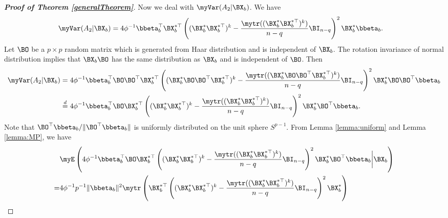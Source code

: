 \begin{proof}[\textbf{Proof of Theorem \ref{generalTheorem}}]
Now we deal with $\myVar (A_2 |\BX_b)$.
We have
\begin{align*}
                \myVar (A_2|\BX_b)&= 
                4 \phi^{-1} \bbeta_b^\top \BX_b^{*\top}
                \left( (\BX_b^* \BX_b^{*\top})^{k} 
                    -\frac{\mytr ( (\BX_b^* \BX_b^{*\top})^{k})}{n-q} 
                \BI_{n-q}
            \right)^2  \BX_b^* \bbeta_b
            .
\end{align*}
Let $\BO$ be a $p\times p$ random matrix  which is generated from Haar distribution and is independent of $\BX_b$.
The rotation invariance of normal distribution implies that $\BX_b\BO$ has the same distribution as $\BX_b$ and is independent of $\BO$.
Then
\begin{equation*}
    \begin{split}
    \myVar (A_2 |\BX_b)
    &=
    4\phi^{-1} \bbeta_b^\top \BO \BO^\top  \BX_b^{*\top}
                \left( (\BX_b^* \BO \BO^\top \BX_b^{*\top})^{k} 
                    -\frac{\mytr ( (\BX_b^* \BO \BO^\top  \BX_b^{*\top})^{k})}{n-q} 
                \BI_{n-q}
            \right)^2  \BX_b^* \BO \BO^\top  \bbeta_b
            \\
            &\overset{d}{=}
            4\phi^{-1} \bbeta_b^\top \BO  \BX_b^{*\top}
                \left( (\BX_b^*  \BX_b^{*\top})^{k} 
                    -\frac{\mytr ( (\BX_b^*  \BX_b^{*\top})^{k})}{n-q} 
                \BI_{n-q}
            \right)^2  \BX_b^* \BO^\top  \bbeta_b.
    \end{split}
\end{equation*}
Note that $\BO^\top \bbeta_b/\|\BO^\top \bbeta_b\|$ is uniformly distributed on the unit sphere $S^{p-1}$.
From Lemma \ref{lemma:uniform} and Lemma \ref{lemma:MP}, we have
\begin{equation*}
    \begin{split}
        &
                \myE\left(
                    4\phi^{-1} \bbeta_b^\top \BO  \BX_b^{*\top}
                    \left( (\BX_b^*  \BX_b^{*\top})^{k} 
                        -\frac{\mytr ( (\BX_b^*  \BX_b^{*\top})^{k})}{n-q} 
                \BI_{n-q}
            \right)^2  \BX_b^* \BO^\top  \bbeta_b
            \bigg| \BX_b
        \right)
        \\
        =&
        4\phi^{-1} p^{-1}\|\bbeta_b\|^2
        \mytr \left(  \BX_b^{*\top}
            \left( (\BX_b^*  \BX_b^{*\top})^{k} 
                -\frac{\mytr ( (\BX_b^*  \BX_b^{*\top})^{k})}{n-q} 
                \BI_{n-q}
            \right)^2  \BX_b^* 
\right)
\\

\end{split}
\end{equation*}
\end{proof}
